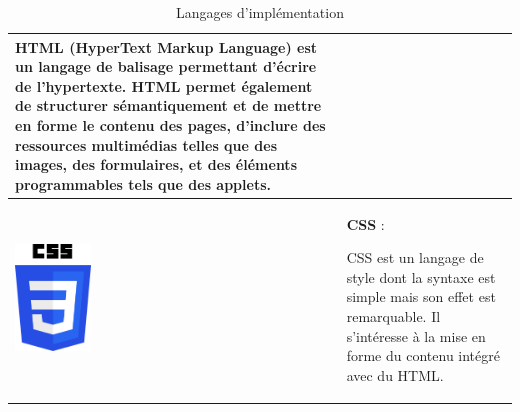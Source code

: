\documentclass{article}
\begin{document}
\begin{table}[h!]
\begin{tabular}{|m{2cm}|m{15cm}|}
                            HTML (HyperText Markup Language) est un langage de balisage permettant d'écrire de l'hypertexte. HTML permet également de structurer sémantiquement et de mettre en forme le contenu des pages, d'inclure des ressources multimédias telles que des images, des formulaires, et des éléments programmables tels que des applets.\\
                            \hline
                            \includegraphics[width=2cm]{assets/logos/css.png} &
                            \textbf{CSS} :
                            
                            CSS est un langage de style dont la syntaxe est simple mais son effet est remarquable. Il s'intéresse à la mise en forme du contenu intégré avec du HTML. \\
                            \hline
                        \end{tabular}
                        \caption{Langages d'implémentation}
                    \end{table}
                \FloatBarrier
\end{document}
